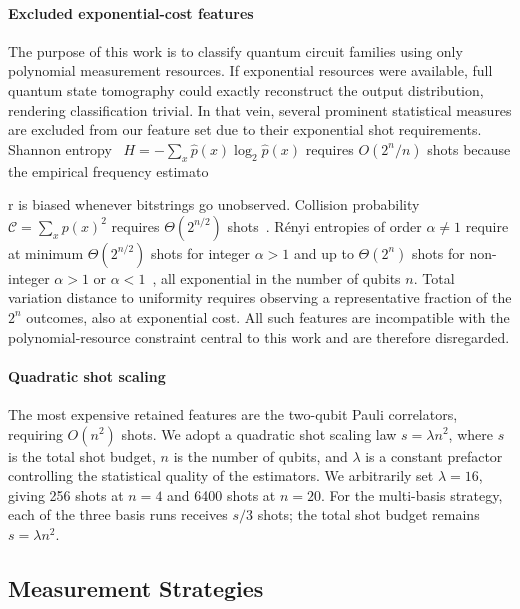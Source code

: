 \documentclass[conference]{IEEEtran}
\newcommand{\nqubits}{n}
\newcommand{\shots}{s}
\begin{document}
\paragraph{Excluded exponential-cost features}
The purpose of this work is to classify quantum circuit families using only
polynomial measurement resources.
If exponential resources were available, full quantum state tomography could exactly
reconstruct the output distribution, rendering classification trivial.
In that vein, several prominent statistical measures are excluded from our feature set
due to their exponential shot requirements.
Shannon entropy~\cite{bromiley2004shannon} $H = -\sum_x \hat{p}(x)\log_2 \hat{p}(x)$
requires $O(2^\nqubits / \nqubits)$ shots because the empirical frequency estimato

r
is biased whenever bitstrings go unobserved.
Collision probability $\mathcal{C} = \sum_x p(x)^2$ requires $\Theta(2^{\nqubits/2})$
shots~\cite{Canonne2020}.
R\'{e}nyi entropies of order $\alpha \neq 1$ require at minimum
$\Theta(2^{\nqubits/2})$ shots for integer $\alpha > 1$ and up to
$\Theta(2^\nqubits)$ shots for non-integer $\alpha > 1$ or $\alpha < 1$~\cite{Archarya2017estimating},
all exponential in the number of qubits $\nqubits$.
Total variation distance to uniformity requires observing a representative fraction
of the $2^\nqubits$ outcomes, also at exponential cost.
All such features are incompatible with the polynomial-resource constraint central
to this work and are therefore disregarded.

\paragraph{Quadratic shot scaling}
The most expensive retained features are the two-qubit Pauli correlators, requiring $O(\nqubits^2)$ shots.
We adopt a quadratic shot scaling law $\shots = \lambda \nqubits^2$, where $\shots$ is the total shot budget, $\nqubits$ is the number of qubits, and $\lambda$ is a constant prefactor controlling the statistical quality of the estimators.
We arbitrarily set $\lambda = 16$, giving 256 shots at $\nqubits = 4$ and 6400 shots at $\nqubits = 20$.
For the multi-basis strategy, each of the three basis runs receives $\shots / 3$ shots; the total shot budget remains $\shots = \lambda\nqubits^2$.

\subsection{Measurement Strategies}
\label{sec:strategies}
\end{document}
